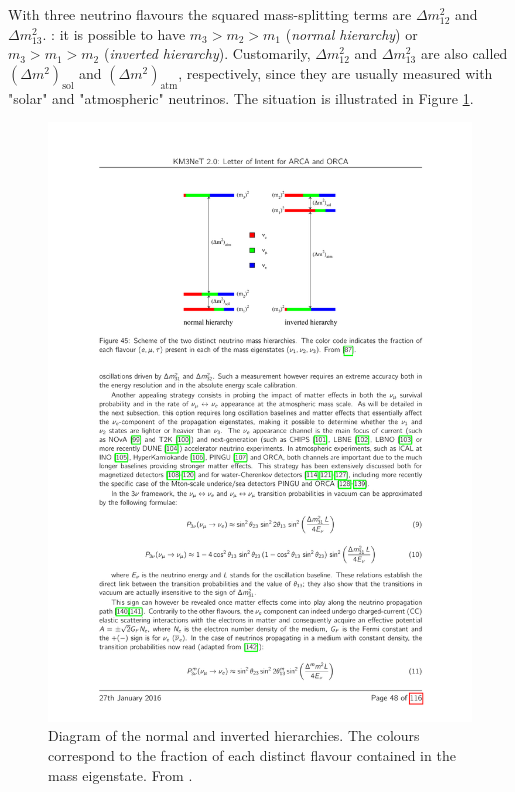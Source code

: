 With three neutrino flavours the squared mass-splitting terms are $\Delta m_{12}^2$ and $\Delta m_{13}^2$. : it is possible to have $m_3 > m_2 > m_1$ (\emph{normal hierarchy}) or $m_3 > m_1 > m_2$ (\emph{inverted hierarchy}). Customarily, $\Delta m_{12}^2$ and $\Delta m_{13}^2$ are also called $(\Delta m^2)_{\mathrm{sol}}$ and $(\Delta m^2)_{\mathrm{atm}}$, respectively, since they are usually measured with "solar" and "atmospheric" neutrinos. The situation is illustrated in Figure \ref{fig:masshierarchy}.

\begin{figure}
    \centering
    \includegraphics[width=0.75\linewidth]{figures/masshierarchy.pdf}
    \caption{Diagram of the normal and inverted hierarchies. The colours correspond to the fraction of each distinct flavour contained in the mass eigenstate. From \cite{Cahn:2013taa}.}
    \label{fig:masshierarchy}
\end{figure}

